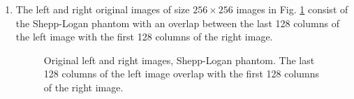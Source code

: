 \begin{enumerate}
\item The left and right original images of size $256 \times 256$ images  in Fig. \ref{fig:expt31} consist of the Shepp-Logan phantom with an overlap between the last 128 columns of the left image with the first 128 columns of the right image. 
\begin{figure}[b!]

\hspace{0.4in}
		\hspace{0.2in}
\caption [Original images, Shepp-Logan phantom, 50\% overlap]{Original left and right images, Shepp-Logan phantom. The last 128 columns of the left image overlap with the first 128 columns of the right image.}
\label{fig:expt31}
\end{figure}


\end{enumerate}
